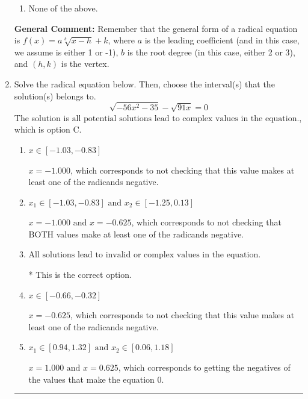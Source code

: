 \documentclass{extbook}[14pt]
\newcommand{\litem}[1]{\item #1

\rule{\textwidth}{0.4pt}}
\begin{document}
\begin{enumerate}
{\begin{enumerate}[label=\Alph*.]
\item None of the above.\end{enumerate}
\textbf{General Comment:} Remember that the general form of a radical equation is $ f(x) = a \sqrt[b]{x - h} + k $, where $a$ is the leading coefficient (and in this case, we assume is either 1 or -1), $b$ is the root degree (in this case, either 2 or 3), and $(h, k)$ is the vertex.
}
\litem{
Solve the radical equation below. Then, choose the interval(s) that the solution(s) belongs to.
\[ \sqrt{-56 x^2 - 35} - \sqrt{91 x} = 0 \]The solution is \( \text{all potential solutions lead to complex values in the equation.} \), which is option C.\begin{enumerate}[label=\Alph*.]
\item \( x \in [-1.03,-0.83] \)

$x = -1.000$, which corresponds to not checking that this value makes at least one of the radicands negative.
\item \( x_1 \in [-1.03, -0.83] \text{ and } x_2 \in [-1.25,0.13] \)

$x = -1.000 \text{ and } x = -0.625$, which corresponds to not checking that BOTH values make at least one of the radicands negative.
\item \( \text{All solutions lead to invalid or complex values in the equation.} \)

* This is the correct option.
\item \( x \in [-0.66,-0.32] \)

$x = -0.625$, which corresponds to not checking that this value makes at least one of the radicands negative.
\item \( x_1 \in [0.94, 1.32] \text{ and } x_2 \in [0.06,1.18] \)

$x = 1.000 \text{ and } x = 0.625$, which corresponds to getting the negatives of the values that make the equation 0.
\end{enumerate}

}
\end{enumerate}
\end{document}
